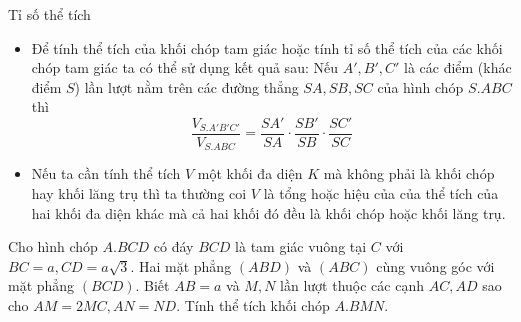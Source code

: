\begin{dang}{Tỉ số thể tích}
\begin{itemize}
  \item Để tính thể tích của khối chóp tam giác hoặc tính tỉ số thể tích của các khối chóp tam giác ta có thể sử dụng kết quả sau: Nếu $A', B', C'$ là các điểm
(khác điểm $S$) lần lượt nằm trên các đường thẳng $SA, SB, SC$ của hình chóp $S.ABC$ thì $$\dfrac{V_{S.A'B'C'}}{V_{S.ABC}}=\dfrac{SA'}{SA}\cdot\dfrac{SB'}{SB}\cdot\dfrac{SC'}{SC}$$
  \item Nếu ta cần tính thể tích $V$ một khối đa diện $K$ mà không phải là khối chóp hay khối lăng trụ thì ta thường coi $V$ là tổng hoặc hiệu của của thể tích của hai khối đa diện khác mà cả hai khối đó đều là khối chóp hoặc khối lăng trụ.
\end{itemize}

\end{dang}
\begin{vd}%
Cho hình chóp $A.BCD$ có đáy $BCD$ là tam giác vuông tại $C$ với $BC=a, CD=a\sqrt{3}$. Hai mặt phẳng $(ABD)$ và $(ABC)$ cùng vuông góc với mặt phẳng $(BCD)$. Biết $AB=a$ và  $M, N$ lần lượt thuộc các cạnh $AC, AD$ sao cho $AM=2MC,AN=ND$. Tính thể tích khối chóp $A.BMN$.
\end{vd}
